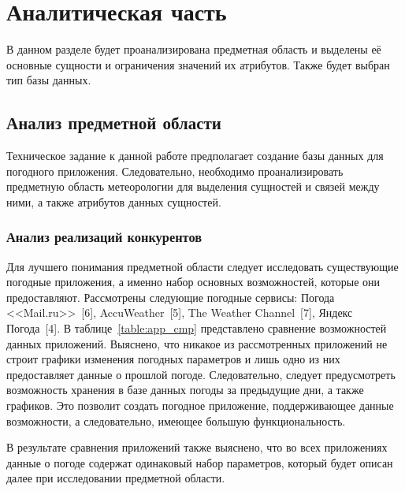 \chapter{Аналитическая часть}

В данном разделе будет проанализирована предметная область и выделены её основные сущности и ограничения значений их атрибутов.
Также будет выбран тип базы данных.

\section{Анализ предметной области}

Техническое задание к данной работе предполагает создание базы данных для погодного приложения.
Следовательно, необходимо проанализировать предметную область метеорологии для выделения сущностей и связей между ними, а также атрибутов данных сущностей.

\subsection{Анализ реализаций конкурентов}
Для лучшего понимания предметной области следует исследовать существующие погодные приложения, а именно набор основных возможностей, которые они предоставляют.
Рассмотрены следующие погодные сервисы: Погода <<Mail.ru>>~[6], AccuWeather~[5], The Weather Channel~[7], Яндекс Погода~[4].
В таблице~\ref{table:app_cmp} представлено сравнение возможностей данных приложений.
Выяснено, что никакое из рассмотренных приложений не строит графики изменения погодных параметров и лишь одно из них предоставляет данные о прошлой погоде.
Следовательно, следует предусмотреть возможность хранения в базе данных погоды за предыдущие дни, а также графиков.
Это позволит создать погодное приложение, поддерживающее данные возможности, а следовательно, имеющее большую функциональность.

В результате сравнения приложений также выяснено, что во всех приложениях данные о погоде содержат одинаковый набор параметров, который будет описан далее при исследовании предметной области.

